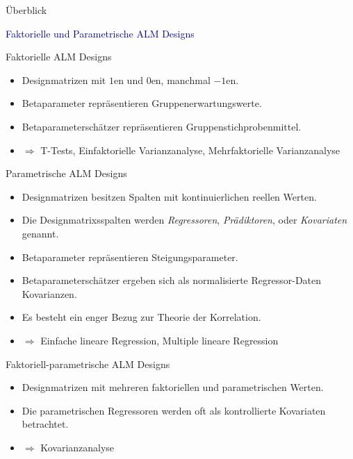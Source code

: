 \documentclass[
  8pt,
  ignorenonframetext,
]{beamer}
\providecommand{\tightlist}{%
  \setlength{\itemsep}{0pt}\setlength{\parskip}{0pt}}
\begin{document}
\begin{frame}{Überblick}
\protect\hypertarget{uxfcberblick}{}
\vspace{2mm}

\textcolor{darkblue}{Faktorielle und Parametrische ALM Designs}

\small

Faktorielle ALM Designs \vspace{-2mm}

\begin{itemize}
\tightlist
\item
  Designmatrizen mit \(1\)en und \(0\)en, manchmal \(-1\)en.
\item
  Betaparameter repräsentieren Gruppenerwartungswerte.
\item
  Betaparameterschätzer repräsentieren Gruppenstichprobenmittel.
\item
  \(\Rightarrow\) T-Tests, Einfaktorielle Varianzanalyse,
  Mehrfaktorielle Varianzanalyse
\end{itemize}

Parametrische ALM Designs \vspace{-2mm}

\begin{itemize}
\tightlist
\item
  Designmatrizen besitzen Spalten mit kontinuierlichen reellen Werten.
\item
  Die Designmatrixsspalten werden \emph{Regressoren},
  \emph{Prädiktoren}, oder \emph{Kovariaten} genannt.
\item
  Betaparameter repräsentieren Steigungsparameter.
\item
  Betaparameterschätzer ergeben sich als normalisierte Regressor-Daten
  Kovarianzen.
\item
  Es besteht ein enger Bezug zur Theorie der Korrelation.
\item
  \(\Rightarrow\) Einfache lineare Regression, Multiple lineare
  Regression
\end{itemize}

Faktoriell-parametrische ALM Designs \vspace{-2mm}

\begin{itemize}
\tightlist
\item
  Designmatrizen mit mehreren faktoriellen und parametrischen Werten.
\item
  Die parametrischen Regressoren werden oft als kontrollierte Kovariaten
  betrachtet.
\item
  \(\Rightarrow\) Kovarianzanalyse
\end{itemize}
\end{frame}
\end{document}
